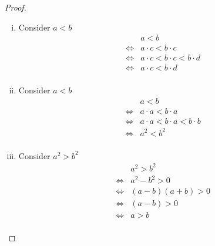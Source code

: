 \documentclass[10pt,letterpaper]{article}
\begin{document}
\begin{proof}
\begin{enumerate}[(i)]
		\item Consider $a < b$ 
		\begin{eqnarray*}
		& & a < b \\
		& \Leftrightarrow & a \cdot c < b \cdot c \\
		& \Leftrightarrow & a \cdot c < b \cdot c < b \cdot d \\
		& \Leftrightarrow & a \cdot c < b \cdot d \\
		\end{eqnarray*}
		
		\item Consider $a < b$
		\begin{eqnarray*}
		& & a < b \\
		& \Leftrightarrow & a \cdot a < b \cdot a \\
		& \Leftrightarrow & a \cdot a < b \cdot a < b \cdot b \\
		& \Leftrightarrow & a^2 < b^2 \\
		\end{eqnarray*}
		
		\item Consider $a^2 > b^2$ 		
		\begin{eqnarray*}
		& & a^2 > b^2 \\
		& \Leftrightarrow & a^2 - b^2 > 0 \\
		& \Leftrightarrow & (a - b)(a + b) > 0 \\
		& \Leftrightarrow & (a - b) > 0 \\
		& \Leftrightarrow & a > b \\
		\end{eqnarray*}
	\end{enumerate}
\end{proof}

\end{document}
